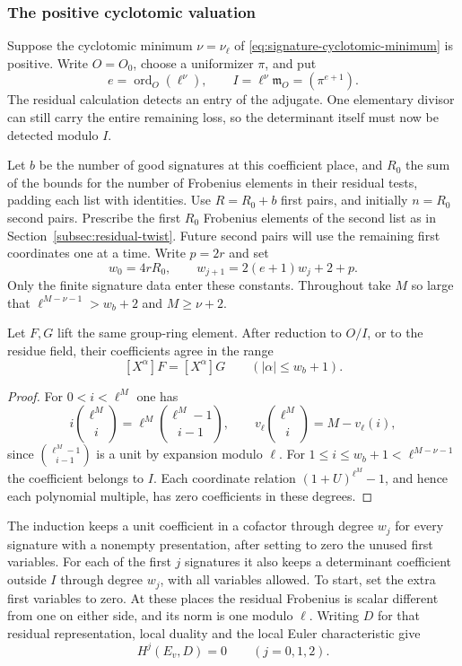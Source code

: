 \subsubsection*{The positive cyclotomic valuation}
\label{subsec:positive-twist}

Suppose the cyclotomic minimum \(\nu=\nu_\ell\) of
\eqref{eq:signature-cyclotomic-minimum} is positive. Write \(O=O_0\), choose a
uniformizer \(\pi\), and put
\[ e=\operatorname{ord}_O(\ell^\nu),\qquad I=\ell^\nu\mathfrak m_O=(\pi^{e+1}). \]
The residual calculation detects an entry of the adjugate. One elementary divisor can still carry the entire remaining loss, so the determinant itself must now be detected modulo \(I\).

Let \(b\) be the number of good signatures at this coefficient
place, and \(R_0\) the sum of the bounds for the number of Frobenius elements in their
residual tests, padding each list with identities. Use \(R=R_0+b\) first pairs, and initially
\(n=R_0\) second pairs. Prescribe the first \(R_0\) Frobenius elements of
the second list as in Section~\ref{subsec:residual-twist}.
Future second pairs will use the remaining first coordinates
one at a time. Write \(p=2r\) and set
\[
 w_0=4rR_0,\qquad w_{j+1}=2(e+1)w_j+2+p .
\]
Only the finite signature data enter these constants. Throughout
take \(M\) so large that \(\ell^{M-\nu-1}>w_b+2\) and
\(M\ge\nu+2\).

\begin{lemma}
Let \(F,G\) lift the same group-ring element. After reduction to \(O/I\), or to the residue field, their coefficients agree in the range
\[
 [X^\alpha]F=[X^\alpha]G\qquad(|\alpha|\le w_b+1).
\]
\end{lemma}
\begin{proof}
For \(0<i<\ell^M\) one has
\[
 i\binom{\ell^M}{i}=\ell^M\binom{\ell^M-1}{i-1},\qquad
 v_\ell\binom{\ell^M}{i}=M-v_\ell(i),
\]
since \(\binom{\ell^M-1}{i-1}\) is a unit by expansion modulo \(\ell\).
For \(1\le i\le w_b+1<\ell^{M-\nu-1}\) the coefficient belongs
to \(I\). Each coordinate relation \((1+U)^{\ell^M}-1\), and hence
each polynomial multiple, has zero coefficients in these degrees.
\end{proof}

The induction keeps a unit coefficient in a cofactor through
degree \(w_j\) for every signature with a nonempty presentation,
after setting to zero the unused first variables. For each of
the first \(j\) signatures it also keeps a determinant coefficient
outside \(I\) through degree \(w_j\), with all variables allowed.
To start, set the extra first variables to zero. At these places
the residual Frobenius is scalar different from one on either
side, and its norm is one modulo \(\ell\). Writing \(D\) for that residual representation, local duality and the local Euler characteristic give
\[
 H^j(E_v,D)=0\qquad(j=0,1,2).
\]

